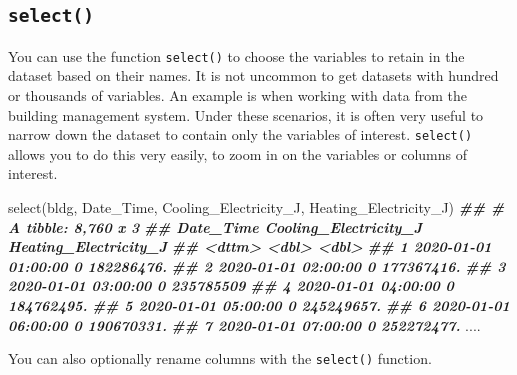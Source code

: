 \documentclass[
]{book}
\newenvironment{Shaded}{\begin{snugshade}}{\end{snugshade}}
\newcommand{\DocumentationTok}[1]{\textcolor[rgb]{0.56,0.35,0.01}{\textbf{\textit{#1}}}}
\newcommand{\FunctionTok}[1]{\textcolor[rgb]{0.00,0.00,0.00}{#1}}
\newcommand{\NormalTok}[1]{#1}
\begin{document}
\hypertarget{select}{%
\subsection{\texorpdfstring{\texttt{select()}}{select()}}\label{select}}

You can use the function \texttt{select()} to choose the variables to retain in the dataset based on their names. It is not uncommon to get datasets with hundred or thousands of variables. An example is when working with data from the building management system. Under these scenarios, it is often very useful to narrow down the dataset to contain only the variables of interest. \texttt{select()} allows you to do this very easily, to zoom in on the variables or columns of interest.

\begin{Shaded}
\begin{Highlighting}[]
\FunctionTok{select}\NormalTok{(bldg, Date\_Time, Cooling\_Electricity\_J, Heating\_Electricity\_J)}
\DocumentationTok{\#\# \# A tibble: 8,760 x 3}
\DocumentationTok{\#\#    Date\_Time           Cooling\_Electricity\_J Heating\_Electricity\_J}
\DocumentationTok{\#\#    \textless{}dttm\textgreater{}                              \textless{}dbl\textgreater{}                 \textless{}dbl\textgreater{}}
\DocumentationTok{\#\#  1 2020{-}01{-}01 01:00:00                     0            182286476.}
\DocumentationTok{\#\#  2 2020{-}01{-}01 02:00:00                     0            177367416.}
\DocumentationTok{\#\#  3 2020{-}01{-}01 03:00:00                     0            235785509 }
\DocumentationTok{\#\#  4 2020{-}01{-}01 04:00:00                     0            184762495.}
\DocumentationTok{\#\#  5 2020{-}01{-}01 05:00:00                     0            245249657.}
\DocumentationTok{\#\#  6 2020{-}01{-}01 06:00:00                     0            190670331.}
\DocumentationTok{\#\#  7 2020{-}01{-}01 07:00:00                     0            252272477.}
\NormalTok{....}
\end{Highlighting}
\end{Shaded}

You can also optionally rename columns with the \texttt{select()} function.
\end{document}
